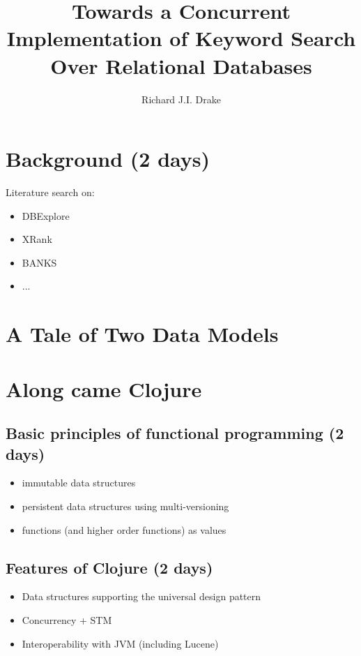 \documentclass[grad]{uoit-thesis}
\author{Richard J.I. Drake}
\title{Towards a Concurrent Implementation of Keyword Search Over Relational Databases}
\begin{document}
	\begin{preliminary}
		\maketitle

		\setcounter{page}{3}

		\tableofcontents

		\listoftables
		\listoffigures
		\listofalgorithms
	\end{preliminary}
	
	\chapter{Background (2 days)}
		Literature search on:

		\begin{itemize}
			\item DBExplore
			\item XRank
			\item BANKS
			\item ...
		\end{itemize}
	
	\chapter{A Tale of Two Data Models}
		

	\chapter{Along came Clojure}
		\section{Basic principles of functional programming (2 days)}
			\begin{itemize}
				\item immutable data structures
				\item persistent data structures using multi-versioning
				\item functions (and higher order functions) as values
			\end{itemize}
		
		\section{Features of Clojure (2 days)}
			\begin{itemize}
				\item Data structures supporting the universal design pattern
				\item Concurrency + STM
				\item Interoperability with JVM (including Lucene)
			\end{itemize}
\end{document}
